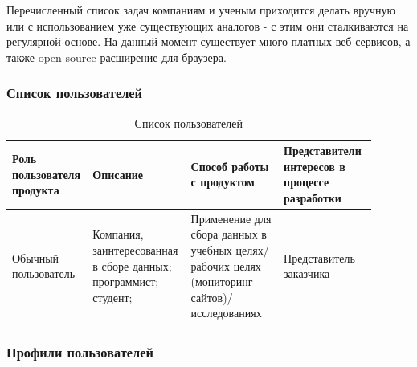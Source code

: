 \documentclass[a4paper,12pt]{article}
\begin{document}
	Перечисленный список задач компаниям и ученым приходится делать вручную или с использованием уже существующих аналогов - с этим они сталкиваются на регулярной основе. На данный момент существует много платных веб-сервисов, а также open source расширение для браузера.
	
	
	\subsubsection{Список пользователей} \label{subsub: userlist}
	\begin{table}[ht]
		\centering
		\begin{tabular}{|p{0.15\linewidth}|p{0.25\linewidth}|p{0.25\linewidth}|p{0.25\linewidth}|} 
			\hline
			\textbf{Роль пользователя продукта} & \textbf{Описание} & \textbf{Способ работы с продуктом} & \textbf{Представители
				интересов в процессе
				разработки}\\ \hline
			Обычный пользователь & Компания, заинтересованная в сборе данных; программист; студент; & Применение для сбора данных в учебных целях/ рабочих целях (мониторинг сайтов)/исследованиях & Представитель заказчика \\ \hline
		\end{tabular}
	\caption{Список пользователей}
	\end{table}

\newpage
	\subsubsection{Профили пользователей} \label{subsub: userprofile}
	
\end{document}

